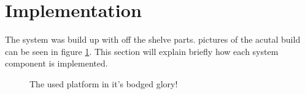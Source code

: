 \section{Implementation}
The system was build up with off the shelve parts. pictures of the acutal build can be seen in figure \ref{fig:acutalBuild}. This section will explain briefly how each system component is implemented.

\begin{figure}
	\centering     %
	\label{fig:acutalBuild}
	\caption{The used platform in it's bodged glory!}
\end{figure}